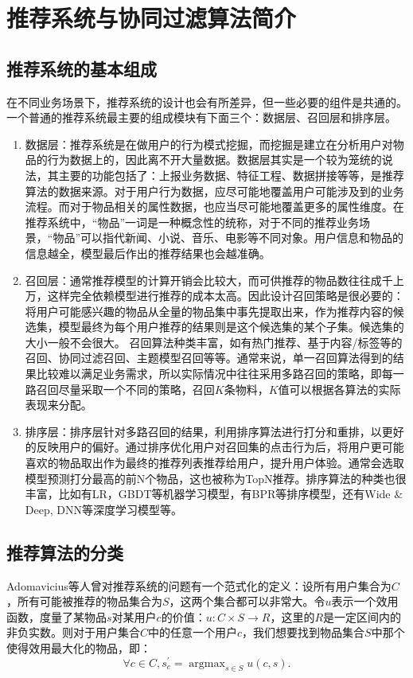 
\chapter{推荐系统与协同过滤算法简介}
  \section{推荐系统的基本组成}
  在不同业务场景下，推荐系统的设计也会有所差异，但一些必要的组件是共通的。一个普通的推荐系统最主要的组成模块有下面三个：数据层、召回层和排序层。

  \begin{enumerate}
    \item 数据层：推荐系统是在做用户的行为模式挖掘，而挖掘是建立在分析用户对物品的行为数据上的，因此离不开大量数据。数据层其实是一个较为笼统的说法，其主要的功能包括了：上报业务数据、特征工程、数据拼接等等，是推荐算法的数据来源。对于用户行为数据，应尽可能地覆盖用户可能涉及到的业务流程。而对于物品相关的属性数据，也应当尽可能地覆盖更多的属性维度。在推荐系统中，“物品”一词是一种概念性的统称，对于不同的推荐业务场景，“物品”可以指代新闻、小说、音乐、电影等不同对象。用户信息和物品的信息越全，模型最后作出的推荐结果也会越准确。

    \item 召回层：通常推荐模型的计算开销会比较大，而可供推荐的物品数往往成千上万，这样完全依赖模型进行推荐的成本太高。因此设计召回策略是很必要的：将用户可能感兴趣的物品从全量的物品集中事先提取出来，作为推荐内容的候选集，模型最终为每个用户推荐的结果则是这个候选集的某个子集。候选集的大小一般不会很大。
    召回算法种类丰富，如有热门推荐、基于内容/标签等的召回、协同过滤召回、主题模型召回等等。通常来说，单一召回算法得到的结果比较难以满足业务需求，所以实际情况中往往采用多路召回的策略，即每一路召回尽量采取一个不同的策略，召回$K$条物料，$K$值可以根据各算法的实际表现来分配。

    \item 排序层：排序层针对多路召回的结果，利用排序算法进行打分和重排，以更好的反映用户的偏好。通过排序优化用户对召回集的点击行为后，将用户更可能喜欢的物品取出作为最终的推荐列表推荐给用户，提升用户体验。通常会选取模型预测打分最高的前N个物品，这也被称为TopN推荐。排序算法的种类也很丰富，比如有LR，GBDT等机器学习模型，有BPR等排序模型，还有Wide \& Deep, DNN等深度学习模型等。
  \end{enumerate}

  \section{推荐算法的分类}
  Adomavicius等人\cite{adomavicius2005toward}曾对推荐系统的问题有一个范式化的定义：设所有用户集合为$C$，所有可能被推荐的物品集合为$S$，这两个集合都可以非常大。令$u$表示一个效用函数，度量了某物品$s$对某用户$c$的价值：$u:C\times S\rightarrow R$，这里的$R$是一定区间内的非负实数。则对于用户集合$C$中的任意一个用户$c$，我们想要找到物品集合$S$中那个使得效用最大化的物品，即：
  \begin{equation}
  \forall c\in C, s_c^{'}=\mathop{argmax}_{s\in S}u(c,s).
  \end{equation}

